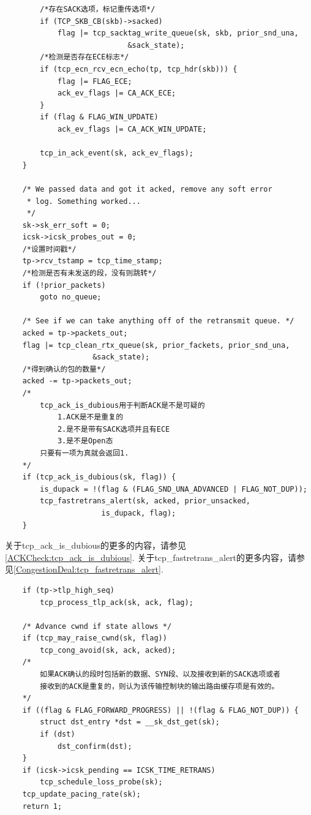 \begin{verbatim}
        /*存在SACK选项，标记重传选项*/
        if (TCP_SKB_CB(skb)->sacked)
            flag |= tcp_sacktag_write_queue(sk, skb, prior_snd_una,
                            &sack_state);
        /*检测是否存在ECE标志*/
        if (tcp_ecn_rcv_ecn_echo(tp, tcp_hdr(skb))) {
            flag |= FLAG_ECE;
            ack_ev_flags |= CA_ACK_ECE;
        }
        if (flag & FLAG_WIN_UPDATE)
            ack_ev_flags |= CA_ACK_WIN_UPDATE;

        tcp_in_ack_event(sk, ack_ev_flags);
    }

    /* We passed data and got it acked, remove any soft error
     * log. Something worked...
     */
    sk->sk_err_soft = 0;
    icsk->icsk_probes_out = 0;
    /*设置时间戳*/
    tp->rcv_tstamp = tcp_time_stamp;
    /*检测是否有未发送的段，没有则跳转*/
    if (!prior_packets)
        goto no_queue;

    /* See if we can take anything off of the retransmit queue. */
    acked = tp->packets_out;
    flag |= tcp_clean_rtx_queue(sk, prior_fackets, prior_snd_una,
                    &sack_state);
    /*得到确认的包的数量*/
    acked -= tp->packets_out;
    /*
        tcp_ack_is_dubious用于判断ACK是不是可疑的
            1.ACK是不是重复的
            2.是不是带有SACK选项并且有ECE   
            3.是不是Open态
        只要有一项为真就会返回1.
    */
    if (tcp_ack_is_dubious(sk, flag)) {
        is_dupack = !(flag & (FLAG_SND_UNA_ADVANCED | FLAG_NOT_DUP));
        tcp_fastretrans_alert(sk, acked, prior_unsacked,
                      is_dupack, flag);
    }
\end{verbatim}

    关于tcp\_ack\_is\_dubious的更多的内容，请参见\ref{ACKCheck:tcp_ack_is_dubious}.
    关于tcp\_fastretrans\_alert的更多内容，请参见\ref{CongestionDeal:tcp_fastretrans_alert}.
\begin{verbatim}
    if (tp->tlp_high_seq)
        tcp_process_tlp_ack(sk, ack, flag);

    /* Advance cwnd if state allows */
    if (tcp_may_raise_cwnd(sk, flag))
        tcp_cong_avoid(sk, ack, acked);
    /*
        如果ACK确认的段时包括新的数据、SYN段、以及接收到新的SACK选项或者
        接收到的ACK是重复的，则认为该传输控制块的输出路由缓存项是有效的。
    */
    if ((flag & FLAG_FORWARD_PROGRESS) || !(flag & FLAG_NOT_DUP)) {
        struct dst_entry *dst = __sk_dst_get(sk);
        if (dst)
            dst_confirm(dst);
    }
    if (icsk->icsk_pending == ICSK_TIME_RETRANS)
        tcp_schedule_loss_probe(sk);
    tcp_update_pacing_rate(sk);
    return 1;
\end{verbatim}

